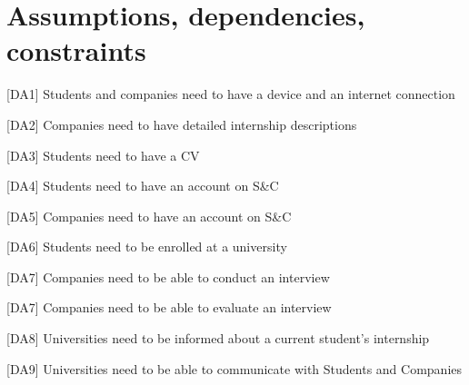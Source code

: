 \section{Assumptions, dependencies, constraints}
[DA1] Students and companies need to have a device and an internet connection

[DA2] Companies need to have detailed internship descriptions

[DA3] Students need to have a CV

[DA4] Students need to have an account on S\&C

[DA5] Companies need to have an account on S\&C

[DA6] Students need to be enrolled at a university 

[DA7] Companies need to be able to conduct an interview

[DA7] Companies need to be able to evaluate an interview

[DA8] Universities need to be informed about a current student's internship

[DA9] Universities need to be able to communicate with Students and Companies



